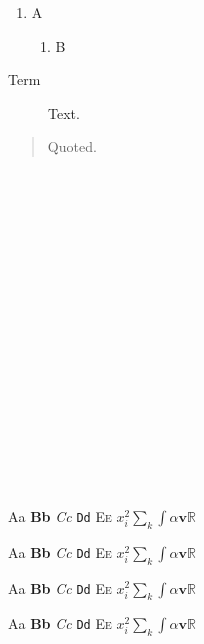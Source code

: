 \documentclass[11pt]{article}
\begin{document}
\begin{enumerate}\item A\begin{enumerate}\item B\end{enumerate}\end{enumerate}
\begin{description}\item[Term] Text.\end{description}
\begin{quote}Quoted.\end{quote}
{\tiny \textbullet\ \textdegree\ \textmu\ \texttimes\ \textbf{\textbullet} \emph{\textdegree}}\par
{\scriptsize \textbullet\ \textdegree\ \textmu\ \texttimes\ \textbf{\textbullet} \emph{\textdegree}}\par
{\footnotesize \textbullet\ \textdegree\ \textmu\ \texttimes\ \textbf{\textbullet} \emph{\textdegree}}\par
{\small \textbullet\ \textdegree\ \textmu\ \texttimes\ \textbf{\textbullet} \emph{\textdegree}}\par
{\normalsize \textbullet\ \textdegree\ \textmu\ \texttimes\ \textbf{\textbullet} \emph{\textdegree}}\par
{\large \textbullet\ \textdegree\ \textmu\ \texttimes\ \textbf{\textbullet} \emph{\textdegree}}\par
{\Large \textbullet\ \textdegree\ \textmu\ \texttimes\ \textbf{\textbullet} \emph{\textdegree}}\par
{\LARGE \textbullet\ \textdegree\ \textmu\ \texttimes\ \textbf{\textbullet} \emph{\textdegree}}\par
{\huge \textbullet\ \textdegree\ \textmu\ \texttimes\ \textbf{\textbullet} \emph{\textdegree}}\par
{\Huge \textbullet\ \textdegree\ \textmu\ \texttimes\ \textbf{\textbullet} \emph{\textdegree}}\par
{\tiny Aa \textbf{Bb} \emph{Cc} \texttt{Dd} \textsc{Ee} $x_{i}^{2} \sum_k \int \alpha \mathbf{v} \mathbb{R}$}\par
{\scriptsize Aa \textbf{Bb} \emph{Cc} \texttt{Dd} \textsc{Ee} $x_{i}^{2} \sum_k \int \alpha \mathbf{v} \mathbb{R}$}\par
{\footnotesize Aa \textbf{Bb} \emph{Cc} \texttt{Dd} \textsc{Ee} $x_{i}^{2} \sum_k \int \alpha \mathbf{v} \mathbb{R}$}\par
{\small Aa \textbf{Bb} \emph{Cc} \texttt{Dd} \textsc{Ee} $x_{i}^{2} \sum_k \int \alpha \mathbf{v} \mathbb{R}$}\par
\end{document}
